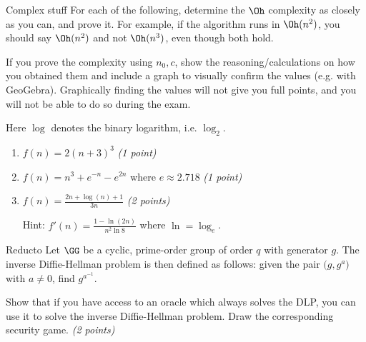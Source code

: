 \documentclass{homework}
\begin{document}
\begin{task}{Complex stuff}
  For each of the following, determine the $\Oh$ complexity as closely as you can, and prove it.
  For example, if the algorithm runs in $\Oh(n^2)$, you should say $\Oh(n^2)$ and not $\Oh(n^3)$, even though both hold.

  If you prove the complexity using $n_0, c$, show the reasoning/calculations on how you obtained them and include a graph to visually confirm the values (e.g. with GeoGebra).
  Graphically finding the values will not give you full points, and you will not be able to do so during the exam.

  Here $\log$ denotes the binary logarithm, i.e. $\log_2$.

  \begin{enumerate}
    \item $f(n) = 2(n + 3)^3$ \textit{(1 point)}
    \item $f(n) = n^3 + e^{-n} - e^{2n}$ where $e \approx 2.718$ \textit{(1 point)}
    \item $f(n) = \frac{2n + \log(n) + 1}{3n}$ \textit{(2 points)}
    
    Hint: $f'(n) = \frac{1 - \ln(2n)}{n^2 \ln8}$ where $\ln = \log_e$.
  \end{enumerate}
\end{task}

\begin{task}{Reducto}
  Let $\GG$ be a cyclic, prime-order group of order $q$ with generator $g$.
  The inverse Diffie-Hellman problem is then defined as follows: given the pair $\bigl(g, g^a\bigr)$ with $a \neq 0$, find $g^{a^{-1}}$.

  Show that if you have access to an oracle which always solves the DLP, you can use it to solve the inverse Diffie-Hellman problem.
  Draw the corresponding security game.
  \textit{(2 points)}
\end{task}

\newpage
\end{document}
